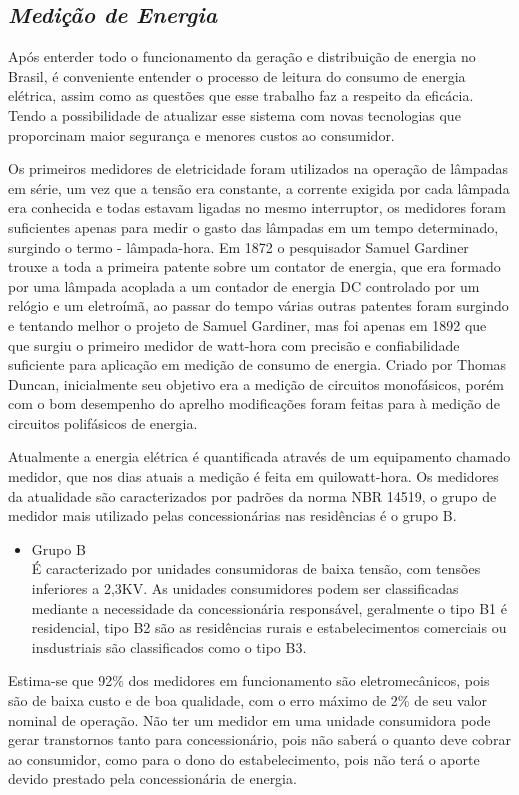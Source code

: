 \subsection[\textit{Medição de Energia}]{\textit{Medição de Energia}}\label{med-energia}

Após enterder todo o funcionamento da geração e distribuição de energia no Brasil, é conveniente entender o processo de leitura do consumo de 
energia elétrica, assim como as questões que esse trabalho faz a respeito da eficácia. Tendo a possibilidade de atualizar esse sistema com novas 
tecnologias que proporcinam maior segurança e menores custos ao consumidor.

Os primeiros medidores de eletricidade foram utilizados na operação de lâmpadas em série, um vez que a tensão era constante, a corrente exigida
por cada lâmpada era conhecida e todas estavam ligadas no mesmo interruptor, os medidores foram suficientes apenas para medir o gasto das lâmpadas
em um tempo determinado, surgindo o termo - lâmpada-hora. Em 1872 o pesquisador Samuel Gardiner trouxe a toda a primeira patente sobre um contator 
de energia, que era formado por uma lâmpada acoplada a um contador de energia DC controlado por um relógio e um eletroímã, ao passar do tempo várias
outras patentes foram surgindo e tentando melhor o projeto de Samuel Gardiner, mas foi apenas em 1892 que que surgiu o primeiro medidor de watt-hora
com precisão e confiabilidade suficiente para aplicação em medição de consumo de energia. Criado por Thomas Duncan, inicialmente seu objetivo era a medição
de circuitos monofásicos, porém com o bom desempenho do aprelho modificações foram feitas para à medição de circuitos polifásicos de energia.

Atualmente a energia elétrica é quantificada através de um equipamento chamado medidor, que nos dias atuais a medição é feita em quilowatt-hora.
Os medidores da atualidade são caracterizados por padrões da norma NBR 14519, o grupo de medidor mais utilizado pelas concessionárias nas residências
é o grupo B. 

\begin{itemize}
	\item Grupo B \\
	É caracterizado por unidades consumidoras de baixa tensão, com tensões inferiores a 2,3KV. As unidades consumidores podem ser classificadas
	mediante a necessidade da concessionária responsável, geralmente o tipo B1 é residencial, tipo B2 são as residências rurais e estabelecimentos
	comerciais ou insdustriais são classificados como o tipo B3.
\end{itemize}

Estima-se que 92\% dos medidores em funcionamento são eletromecânicos, pois são de baixa custo e de boa qualidade, com o erro máximo de 2\% de seu valor
nominal de operação. Não ter um medidor em uma unidade consumidora pode gerar transtornos tanto para concessionário, pois não saberá o quanto deve cobrar ao 
consumidor, como para o dono do estabelecimento, pois não terá o aporte devido prestado pela concessionária de energia.

